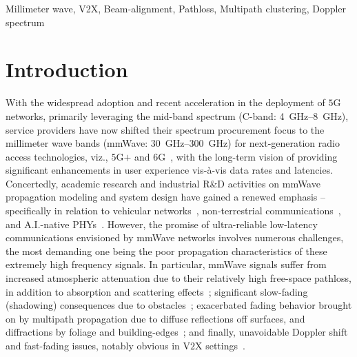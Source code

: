 \documentclass[12pt, draftcls, onecolumn]{IEEEtran}
\begin{document}
\begin{IEEEkeywords}
    Millimeter wave, V2X, Beam-alignment, Pathloss, Multipath clustering, Doppler spectrum
\end{IEEEkeywords}
\vspace{-3mm}

\section{Introduction}\label{S1}
With the widespread adoption and recent acceleration in the deployment of $5$G networks, primarily leveraging the mid-band spectrum (C-band: \SIrange{4}{8}{\giga\hertz}), service providers have now shifted their spectrum procurement focus to the millimeter wave bands (mmWave: \SIrange{30}{300}{\giga\hertz}) for next-generation radio access technologies, viz., $5$G$+$ and $6$G~\cite{mmWaveSurvey, Commercial, 5GBSurvey, 6GSurvey}, with the long-term vision of providing significant enhancements in user experience vis-\`{a}-vis data rates and latencies. Concertedly, academic research and industrial R\&D activities on mmWave propagation modeling and system design have gained a renewed emphasis -- specifically in relation to vehicular networks~\cite{VehicularBeamSelection, CVBeamAlignmentV2X}, non-terrestrial communications~\cite{mmWaveRuralNTNOpportunities, UAVBeamTracking}, and A.I.-native PHYs~\cite{6GAINative, OTAGANs}. However, the promise of ultra-reliable low-latency communications envisioned by mmWave networks involves numerous challenges, the most demanding one being the poor propagation characteristics of these extremely high frequency signals. In particular, mmWave signals suffer from increased atmospheric attenuation due to their relatively high free-space pathloss, in addition to absorption and scattering effects~\cite{Rappaport}; significant slow-fading (shadowing) consequences due to obstacles~\cite{SuburbanGeometryJournal}; exacerbated fading behavior brought on by multipath propagation due to diffuse reflections off surfaces, and diffractions by foliage and building-edges~\cite{Outdoor28G}; and finally, unavoidable Doppler shift and fast-fading issues, notably obvious in V$2$X settings~\cite{V2XBlockages}.
\end{document}
